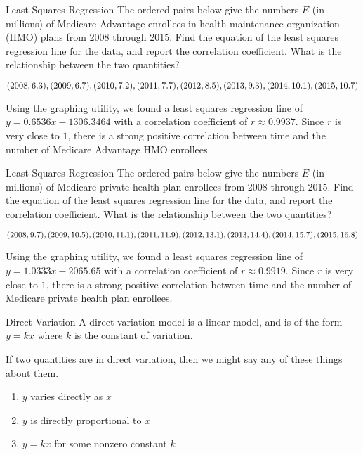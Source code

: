 \documentclass[t]{beamer}
\begin{document}
	\begin{frame}{Least Squares Regression}
		The ordered pairs below give the numbers $E$ (in millions) of Medicare Advantage enrollees in health maintenance organization (HMO) plans from 2008 through 2015. Find the equation of the least squares regression line for the data, and report the correlation coefficient. What is the relationship between the two quantities?
		
		$(2008, 6.3), (2009, 6.7), (2010, 7.2), (2011, 7.7), \newline (2012, 8.5), (2013, 9.3), (2014, 10.1), (2015, 10.7)$ \pause 
		
		Using the graphing utility, we found a least squares regression line of $y = 0.6536x - 1306.3464$ with a correlation coefficient of $r \approx 0.9937$. \pause Since $r$ is very close to $1$, there is a strong positive correlation between time and the number of Medicare Advantage HMO enrollees.
	\end{frame}

	\begin{frame}{Least Squares Regression}
		The ordered pairs below give the numbers $E$ (in millions) of Medicare private health plan enrollees from 2008 through 2015. Find the equation of the least squares regression line for the data, and report the correlation coefficient. What is the relationship between the two quantities?
		
		$(2008, 9.7), (2009, 10.5), (2010, 11.1), (2011, 11.9), \newline (2012, 13.1), (2013, 14.4), (2014, 15.7), (2015, 16.8)$ \pause
		
		Using the graphing utility, we found a least squares regression line of $y = 1.0333x - 2065.65$ with a correlation coefficient of $r \approx 0.9919$. \pause Since $r$ is very close to $1$, there is a strong positive correlation between time and the number of Medicare private health plan enrollees.
	\end{frame}

	\begin{frame}{Direct Variation}
		A direct variation model is a linear model, and is of the form $y = kx$ where $k$ is the constant of variation.
		
		If two quantities are in direct variation, then we might say any of these things about them. \begin{enumerate}[1)]
			\item $y$ varies directly as $x$
			\item $y$ is directly proportional to $x$
			\item $y = kx$ for some nonzero constant $k$
		\end{enumerate}
	\end{frame}
\end{document}
